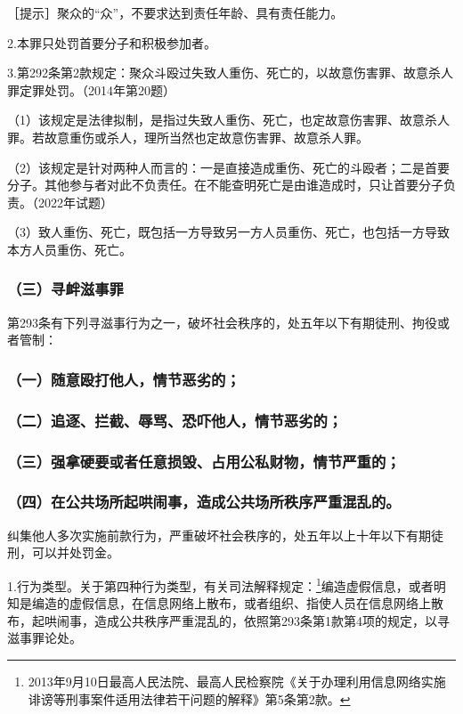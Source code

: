［提示］聚众的“众”，不要求达到责任年龄、具有责任能力。

2.本罪只处罚首要分子和积极参加者。

3.第292条第2款规定：聚众斗殴过失致人重伤、死亡的，以故意伤害罪、故意杀人罪定罪处罚。（2014年第20题）

（1）该规定是法律拟制，是指过失致人重伤、死亡，也定故意伤害罪、故意杀人罪。若故意重伤或杀人，理所当然也定故意伤害罪、故意杀人罪。

（2）该规定是针对两种人而言的：一是直接造成重伤、死亡的斗殴者；二是首要分子。其他参与者对此不负责任。在不能查明死亡是由谁造成时，只让首要分子负责。（2022年试题）

（3）致人重伤、死亡，既包括一方导致另一方人员重伤、死亡，也包括一方导致本方人员重伤、死亡。

\subsubsection*{（三）寻衅滋事罪}

第293条有下列寻滋事行为之一，破坏社会秩序的，处五年以下有期徒刑、拘役或者管制：

\subsubsection*{（一）随意殴打他人，情节恶劣的；}

\subsubsection*{（二）追逐、拦截、辱骂、恐吓他人，情节恶劣的；}

\subsubsection*{（三）强拿硬要或者任意损毁、占用公私财物，情节严重的；}

\subsubsection*{（四）在公共场所起哄闹事，造成公共场所秩序严重混乱的。}

纠集他人多次实施前款行为，严重破坏社会秩序的，处五年以上十年以下有期徒刑，可以并处罚金。

1.行为类型。关于第四种行为类型，有关司法解释规定：\footnote{2013年9月10日最高人民法院、最高人民检察院《关于办理利用信息网络实施诽谤等刑事案件适用法律若干问题的解释》第5条第2款。}编造虚假信息，或者明知是编造的虚假信息，在信息网络上散布，或者组织、指使人员在信息网络上散布，起哄闹事，造成公共秩序严重混乱的，依照第293条第1款第4项的规定，以寻滋事罪论处。

